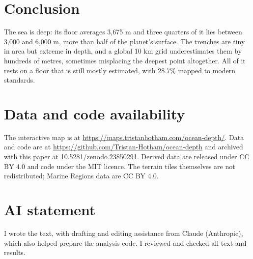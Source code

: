 \documentclass[11pt,a4paper]{article}
\begin{document}
\section{Conclusion}
The sea is deep: its floor averages 3,675 m and three quarters of it lies between 3,000 and 6,000 m, more than half of the planet's surface. The trenches are tiny in area but extreme in depth, and a global 10 km grid underestimates them by hundreds of metres, sometimes misplacing the deepest point altogether. All of it rests on a floor that is still mostly estimated, with 28.7\% mapped to modern standards.

\section*{Data and code availability}
The interactive map is at \url{https://maps.tristanhotham.com/ocean-depth/}. Data and code are at \url{https://github.com/Tristan-Hotham/ocean-depth} and archived with this paper at 10.5281/zenodo.23850291. Derived data are released under CC BY 4.0 and code under the MIT licence. The terrain tiles themselves are not redistributed; Marine Regions data are CC BY 4.0.

\section*{AI statement}
I wrote the text, with drafting and editing assistance from Claude (Anthropic), which also helped prepare the analysis code. I reviewed and checked all text and results.
\end{document}
